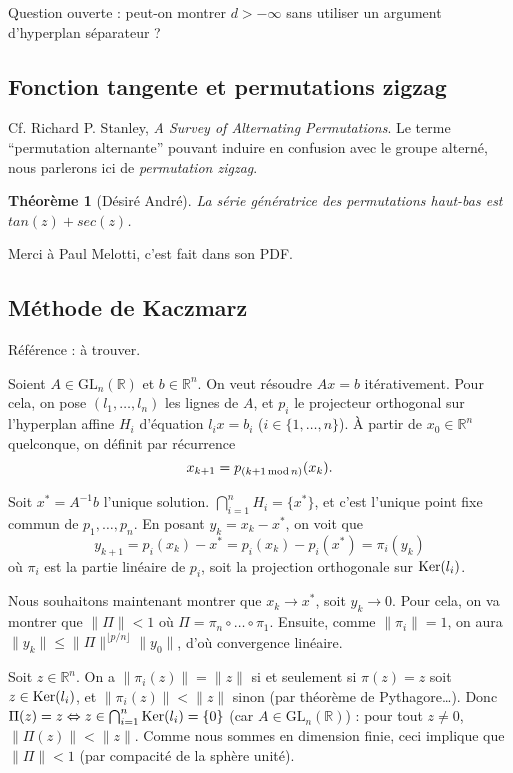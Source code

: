 \documentclass[a4paper, 11pt]{article}
\def\R{\mathbb{R}}
\def\Ker{\textnormal{Ker}}
\def\GL{\mathrm{GL}}
\newtheorem*{theorem}{Théorème}
\begin{document}
Question ouverte : peut-on montrer $d > -\infty$ sans utiliser un argument
d'hyperplan séparateur ?


\newpage

\subsection{Fonction tangente et permutations zigzag}

Cf. Richard P. Stanley, \emph{A Survey of Alternating Permutations}. Le terme
\enquote{permutation alternante} pouvant induire en confusion avec le groupe
alterné, nous parlerons ici de \emph{permutation zigzag}.

\begin{theorem}[Désiré André]
La série génératrice des permutations haut-bas est $tan(z)+sec(z)$.
\end{theorem}

Merci à Paul Melotti, c'est fait dans son PDF.

\subsection{Méthode de Kaczmarz}

Référence : à trouver.

Soient $A \in \GL_n(\R)$ et $b \in \R^n$. On veut résoudre $Ax = b$
itérativement. Pour cela, on pose $(l_1, \ldots, l_n)$ les lignes de $A$, et
$p_i$ le projecteur orthogonal sur l'hyperplan affine $H_i$ d'équation $l_ix =
b_i$ ($i \in \{1, \ldots, n\}$). À partir de $x_0 \in \R^n$ quelconque, on
définit par récurrence
\[ x_{k+1} = p_{(k+1\, \textnormal{mod}\, n)}(x_k). \]

Soit $x^* = A^{-1}b$ l'unique solution. $\bigcap_{i=1}^n H_i = \{x^*\}$, et
c'est l'unique point fixe commun de $p_1, \ldots, p_n$. En posant $y_k = x_k -
x^*$, on voit que
\[ y_{k+1} = p_i(x_k) - x^* = p_i(x_k) - p_i(x^*) = \pi_i(y_k) \] où $\pi_i$ est
la partie linéaire de $p_i$, soit la projection orthogonale sur $\Ker(l_i)$.

Nous souhaitons maintenant montrer que $x_k \longrightarrow x^*$, soit $y_k
\longrightarrow 0$. Pour cela, on va montrer que $\|\Pi\| < 1$ où $\Pi = \pi_n
\circ \ldots \circ \pi_1$. Ensuite, comme $\|\pi_i\| = 1$, on aura $\|y_k\| \leq
\|\Pi\|^{\lfloor p/n \rfloor} \|y_0\|$, d'où convergence linéaire.

Soit $z \in \R^n$. On a $\|\pi_i(z)\| = \|z\|$ si et seulement si $\pi(z) = z$
soit $z \in \Ker(l_i)$, et $\|\pi_i(z)\| < \|z\|$ sinon (par théorème de
Pythagore…). Donc $\Pi(z) = z \Leftrightarrow z \in \bigcap_{i=1}^n \Ker(l_i) =
\{0\}$ (car $A \in \GL_n(\R)$) : pour tout $z \neq 0$, $\|\Pi(z)\| < \|z\|$.
Comme nous sommes en dimension finie, ceci implique que $\|\Pi\| < 1$ (par
compacité de la sphère unité).
\end{document}
